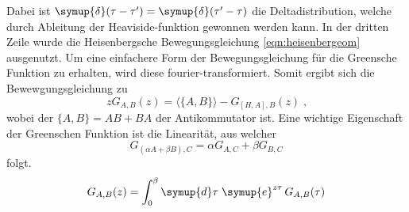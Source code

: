 Dabei ist  $\symup{\delta} (\tau-\tau') = \symup{\delta} (\tau'-\tau) $ die Deltadistribution, welche durch Ableitung der Heaviside-funktion gewonnen werden kann.
In der dritten Zeile wurde die Heisenbergsche Bewegungsgleichung \eqref{eqn:heisenbergeom} ausgenutzt.
Um eine einfachere Form der Bewegungsgleichung für die Greensche Funktion zu erhalten, wird diese fourier-transformiert.
Somit ergibt sich die Bewewgungsgleichung zu 
\begin{equation}
    zG_{A,B}(z) = \langle \{A,B\} \rangle - G_{[H,A],B}(z) \; \text{,} \label{eqn:fouriereom}
\end{equation} 
wobei der $\{ A,B \} = AB+BA$ der Antikommutator ist.
Eine wichtige Eigenschaft der Greenschen Funktion ist die Linearität, aus welcher
\begin{equation*}
    G_{(\alpha A + \beta B), C} = \alpha G_{A,C} + \beta G_{B,C}
\end{equation*}
folgt.
\begin{equation}
    G_{A,B}(z) = \int_0^\beta \symup{d}\tau \; \symup{e}^{z\tau}\, G_{A,B}(\tau)
\end{equation}

